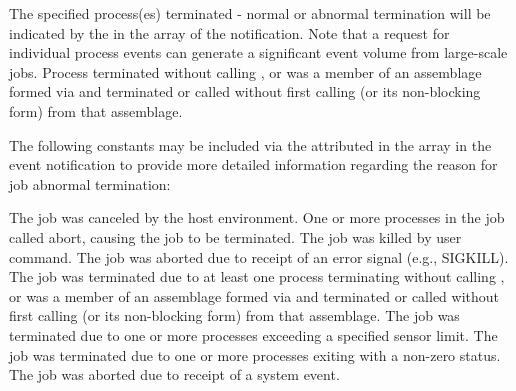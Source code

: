 {\begin{constantdesc}
%
The specified process(es) terminated - normal or abnormal
termination will be indicated by the  in the
 array of the notification. Note that a request for individual
process events can generate a significant event volume from large-scale jobs.
%
Process terminated without calling , or was a member of an assemblage formed via  and terminated or called  without first calling  (or its non-blocking form) from that assemblage.
%
\end{constantdesc}

The following constants may be included via the
 attributed in the  array in the
 event notification to provide more detailed
information regarding the reason for job abnormal termination:

\begin{constantdesc}
%
The job was canceled by the host environment.
%
One or more processes in the job called abort, causing the job to be terminated.
%
The job was killed by user command.
%
The job was aborted due to receipt of an error signal (e.g., SIGKILL).
%
The job was terminated due to at least one process terminating without calling , or was a member of an assemblage formed via  and terminated or called  without first calling  (or its non-blocking form) from that assemblage.
%
The job was terminated due to one or more processes exceeding a specified sensor limit.
%
The job was terminated due to one or more processes exiting with a non-zero status.
%
The job was aborted due to receipt of a system event.
%
\end{constantdesc}


}
